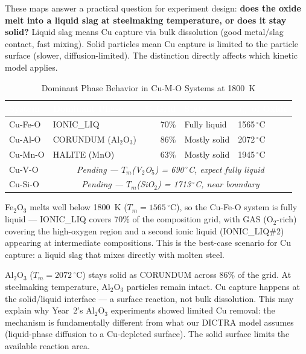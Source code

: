 \documentclass[11pt]{article}
\begin{document}
These maps answer a practical question for experiment design: \textbf{does the oxide melt into a liquid slag at steelmaking temperature, or does it stay solid?} Liquid slag means Cu capture via bulk dissolution (good metal/slag contact, fast mixing). Solid particles mean Cu capture is limited to the particle surface (slower, diffusion-limited). The distinction directly affects which kinetic model applies.

\begin{table}[H]
\caption{Dominant Phase Behavior in Cu-M-O Systems at \SI{1800}{\kelvin}}
\label{tab:phase_map_summary}
\centering
\renewcommand{\arraystretch}{1.15}
\footnotesize
\begin{tabular}{|l|l|r|l|l|}
\hline
\rowcolor{headercolor}
\textcolor{white}{\textbf{System}} & \textcolor{white}{\textbf{Dominant Phase}} & \textcolor{white}{\textbf{\% Grid}} & \textcolor{white}{\textbf{State}} & \textcolor{white}{\textbf{$T_m$ of Oxide}} \\
\hline
Cu-Fe-O & IONIC\_LIQ & 70\% & Fully liquid & 1565\,$^\circ$C \\
\hline
\rowcolor{altrow}
Cu-Al-O & CORUNDUM (Al$_2$O$_3$) & 86\% & Mostly solid & 2072\,$^\circ$C \\
\hline
Cu-Mn-O & HALITE (MnO) & 63\% & Mostly solid & 1945\,$^\circ$C \\
\hline
\rowcolor{altrow}
Cu-V-O & \multicolumn{4}{c|}{\textit{Pending --- $T_m$(V$_2$O$_5$) = 690\,$^\circ$C, expect fully liquid}} \\
\hline
Cu-Si-O & \multicolumn{4}{c|}{\textit{Pending --- $T_m$(SiO$_2$) = 1713\,$^\circ$C, near boundary}} \\
\hline
\end{tabular}
\end{table}

Fe$_2$O$_3$ melts well below \SI{1800}{\kelvin} ($T_m = 1565$\,$^\circ$C), so the Cu-Fe-O system is fully liquid --- IONIC\_LIQ covers 70\% of the composition grid, with GAS (O$_2$-rich) covering the high-oxygen region and a second ionic liquid (IONIC\_LIQ\#2) appearing at intermediate compositions. This is the best-case scenario for Cu capture: a liquid slag that mixes directly with molten steel.

Al$_2$O$_3$ ($T_m = 2072$\,$^\circ$C) stays solid as CORUNDUM across 86\% of the grid. At steelmaking temperature, Al$_2$O$_3$ particles remain intact. Cu capture happens at the solid/liquid interface --- a surface reaction, not bulk dissolution. This may explain why Year~2's Al$_2$O$_3$ experiments showed limited Cu removal: the mechanism is fundamentally different from what our DICTRA model assumes (liquid-phase diffusion to a Cu-depleted surface). The solid surface limits the available reaction area.
\end{document}
